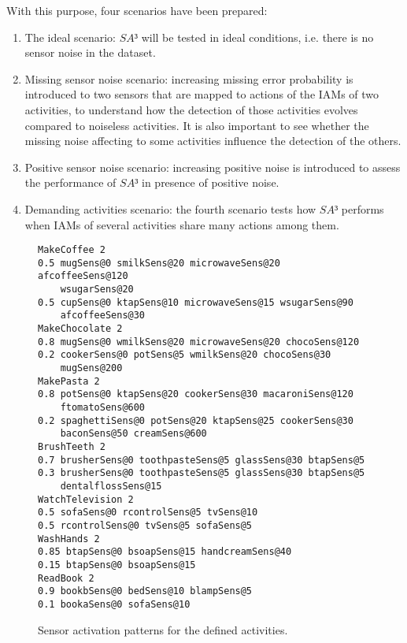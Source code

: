 With this purpose, four scenarios have been prepared: 

\begin{enumerate}
 \item The ideal scenario: $SA³$ will be tested in ideal conditions, i.e. there is no sensor noise in the dataset.
 \item Missing sensor noise scenario: increasing missing error probability is introduced to two sensors that are mapped to actions of the IAMs of two activities, to understand how the detection of those activities evolves compared to noiseless activities. It is also important to see whether the missing noise affecting to some activities influence the detection of the others.
 \item Positive sensor noise scenario: increasing positive noise is introduced to assess the performance of $SA³$ in presence of positive noise.
 \item Demanding activities scenario: the fourth scenario tests how $SA³$ performs when IAMs of several activities share many actions among them. 
\end{enumerate}

\begin{figure}
\begin{small}
\lstset{linewidth=\textwidth}
\begin{lstlisting}
MakeCoffee 2
0.5 mugSens@0 smilkSens@20 microwaveSens@20 afcoffeeSens@120 
    wsugarSens@20
0.5 cupSens@0 ktapSens@10 microwaveSens@15 wsugarSens@90 
    afcoffeeSens@30
MakeChocolate 2
0.8 mugSens@0 wmilkSens@20 microwaveSens@20 chocoSens@120
0.2 cookerSens@0 potSens@5 wmilkSens@20 chocoSens@30 
    mugSens@200
MakePasta 2
0.8 potSens@0 ktapSens@20 cookerSens@30 macaroniSens@120 
    ftomatoSens@600
0.2 spaghettiSens@0 potSens@20 ktapSens@25 cookerSens@30 
    baconSens@50 creamSens@600
BrushTeeth 2
0.7 brusherSens@0 toothpasteSens@5 glassSens@30 btapSens@5
0.3 brusherSens@0 toothpasteSens@5 glassSens@30 btapSens@5 
    dentalflossSens@15
WatchTelevision 2
0.5 sofaSens@0 rcontrolSens@5 tvSens@10
0.5 rcontrolSens@0 tvSens@5 sofaSens@5
WashHands 2
0.85 btapSens@0 bsoapSens@15 handcreamSens@40
0.15 btapSens@0 bsoapSens@15
ReadBook 2
0.9 bookbSens@0 bedSens@10 blampSens@5
0.1 bookaSens@0 sofaSens@10
\end{lstlisting}
\end{small}
\caption{Sensor activation patterns for the defined activities.}
\label{fig:basic-script-activities}
\end{figure}

